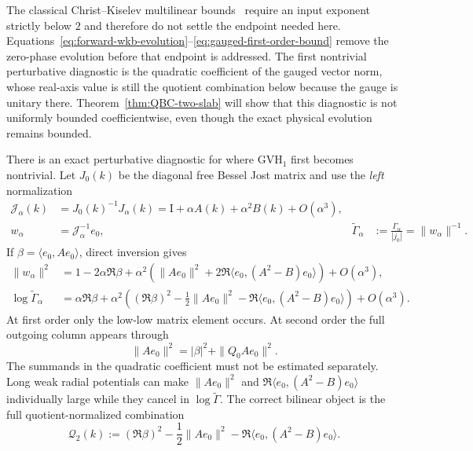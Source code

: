 \documentclass[11pt]{article}
\newcommand{\Id}{\mathrm I}
\theoremstyle{definition}
\theoremstyle{remark}
\begin{document}
The classical Christ--Kiselev multilinear bounds~\cite{ChristKiselev1998} require an input exponent strictly below $2$ and therefore do not settle the endpoint needed here.  Equations~\eqref{eq:forward-wkb-evolution}--\eqref{eq:gauged-first-order-bound} remove the zero-phase evolution before that endpoint is addressed.  The first nontrivial perturbative diagnostic is the quadratic coefficient of the gauged vector norm, whose real-axis value is still the quotient combination below because the gauge is unitary there.  Theorem~\ref{thm:QBC-two-slab} will show that this diagnostic is not uniformly bounded coefficientwise, even though the exact physical evolution remains bounded.

There is an exact perturbative diagnostic for where $\mathrm{GVH}_1$ first becomes nontrivial.  Let $J_0(k)$ be the diagonal free Bessel Jost matrix and use the \emph{left} normalization
\begin{equation}
 \begin{aligned}
 \mathcal J_\alpha(k)&=J_0(k)^{-1}J_\alpha(k)
 =\Id+\alpha A(k)+\alpha^2B(k)+O(\alpha^3),\\
 w_\alpha&=\mathcal J_\alpha^{-1}e_0,
 &\widetilde\Gamma_\alpha
 &:=\frac{\Gamma_\alpha}{|j_0|}
 =\|w_\alpha\|^{-1}.
 \end{aligned}
 \label{eq:scalar-coupling-expansion}
\end{equation}
If $\beta=\langle e_0,Ae_0\rangle$, direct inversion gives
\begin{align}
 \|w_\alpha\|^2
 &=1-2\alpha\Re\beta
 +\alpha^2\left(
   \|Ae_0\|^2
   +2\Re\langle e_0,(A^2-B)e_0\rangle
  \right)+O(\alpha^3),
 \label{eq:scalar-column-expansion}\\
 \log\widetilde\Gamma_\alpha
 &=\alpha\Re\beta
 +\alpha^2\left(
   (\Re\beta)^2-\frac12\|Ae_0\|^2
   -\Re\langle e_0,(A^2-B)e_0\rangle
  \right)+O(\alpha^3).
 \label{eq:scalar-log-expansion}
\end{align}
At first order only the low-low matrix element occurs.  At second order the full outgoing column appears through
\begin{equation}
 \|Ae_0\|^2=|\beta|^2+\|Q_0Ae_0\|^2.
 \label{eq:scalar-first-column}
\end{equation}
The summands in the quadratic coefficient must not be estimated separately.  Long weak radial potentials can make $\|Ae_0\|^2$ and $\Re\langle e_0,(A^2-B)e_0\rangle$ individually large while they cancel in $\log\widetilde\Gamma$.  The correct bilinear object is the full quotient-normalized combination
\begin{equation}
 \mathcal Q_2(k)
 :=(\Re\beta)^2-\frac12\|Ae_0\|^2
   -\Re\langle e_0,(A^2-B)e_0\rangle.
 \label{eq:scalar-Q2}
\end{equation}
\end{document}
